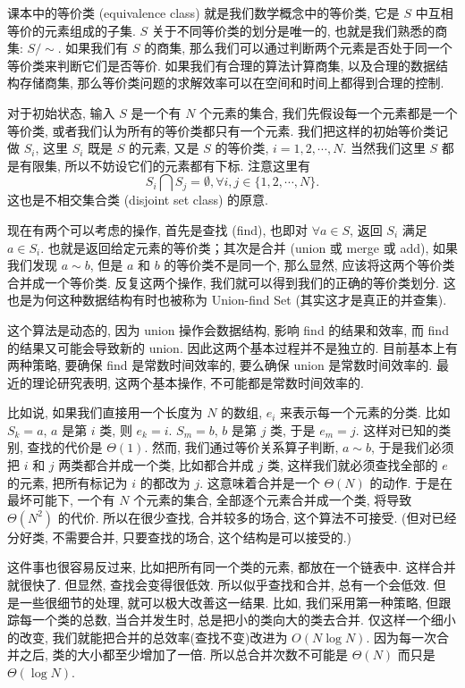 \documentclass[a4paper]{ctexart}
\theoremstyle{definition}
\theoremstyle{definition}
\begin{document}
课本中的等价类 (equivalence class) 就是我们数学概念中的等价类, 
它是 $S$ 中互相等价的元素组成的子集. $S$ 关于不同等价类的划分是唯一的, 
也就是我们熟悉的商集: $S / \sim$. 如果我们有 $S$ 的商集, 
那么我们可以通过判断两个元素是否处于同一个等价类来判断它们是否等价. 
如果我们有合理的算法计算商集, 以及合理的数据结构存储商集, 
那么等价类问题的求解效率可以在空间和时间上都得到合理的控制. 

对于初始状态, 输入 $S$ 是一个有 $N$ 个元素的集合, 我们先假设每一个元素都是一个等价类, 
或者我们认为所有的等价类都只有一个元素. 我们把这样的初始等价类记做 $S_i$, 这里 $S_i$ 既是 $S$ 的元素, 
又是 $S$ 的等价类, $i = 1, 2, \cdots, N$. 当然我们这里 $S$ 都是有限集, 
所以不妨设它们的元素都有下标. 注意这里有 
$$
S_i \bigcap S_j = \emptyset, \forall i, j \in \{1, 2, \cdots, N\}.
$$ 
这也是不相交集合类 (disjoint set class) 的原意.

现在有两个可以考虑的操作, 首先是查找 (find), 也即对 $\forall a \in S$, 
返回 $S_i$ 满足 $a \in S_i$. 也就是返回给定元素的等价类；其次是合并 (union 或 merge 或 add), 
如果我们发现 $a \sim b$, 但是 $a$ 和 $b$ 的等价类不是同一个, 那么显然, 
应该将这两个等价类合并成一个等价类. 反复这两个操作, 我们就可以得到我们的正确的等价类划分. 
这也是为何这种数据结构有时也被称为 Union-find Set (其实这才是真正的并查集).

这个算法是动态的, 因为 union 操作会数据结构, 影响 find 的结果和效率, 而 find 的结果又可能会导致新的 union. 
因此这两个基本过程并不是独立的. 目前基本上有两种策略, 要确保 find 是常数时间效率的, 要么确保 union 是常数时间效率的. 
最近的理论研究表明, 这两个基本操作, 不可能都是常数时间效率的. 

比如说, 如果我们直接用一个长度为 $N$ 的数组, $e_i$ 来表示每一个元素的分类. 
比如 $S_k = a$, $a$ 是第 $i$ 类, 则 $e_k = i$. $S_m = b$, $b$ 是第 $j$ 类, 
于是 $e_m = j$. 这样对已知的类别, 查找的代价是 $\Theta(1)$. 然而, 
我们通过等价关系算子判断, $a \sim b$, 于是我们必须把 $i$ 和 $j$ 两类都合并成一个类, 
比如都合并成 $j$ 类, 这样我们就必须查找全部的 $e$ 的元素, 把所有标记为 $i$ 的都改为 $j$. 
这意味着合并是一个 $\Theta(N)$ 的动作. 于是在最坏可能下, 一个有 $N$ 个元素的集合, 
全部逐个元素合并成一个类, 将导致 $\Theta(N^2)$ 的代价. 所以在很少查找, 合并较多的场合, 
这个算法不可接受. (但对已经分好类, 不需要合并, 只要查找的场合, 这个结构是可以接受的.) 

这件事也很容易反过来, 比如把所有同一个类的元素, 都放在一个链表中. 这样合并就很快了. 
但显然, 查找会变得很低效. 所以似乎查找和合并, 总有一个会低效. 但是一些很细节的处理, 
就可以极大改善这一结果. 比如, 我们采用第一种策略, 但跟踪每一个类的总数, 当合并发生时, 
总是把小的类向大的类去合并. 仅这样一个细小的改变, 我们就能把合并的总效率(查找不变)改进为 $O(N\log N)$.
因为每一次合并之后, 类的大小都至少增加了一倍. 所以总合并次数不可能是 $\Theta(N)$ 而只是 $\Theta(\log N)$. 
\end{document}
